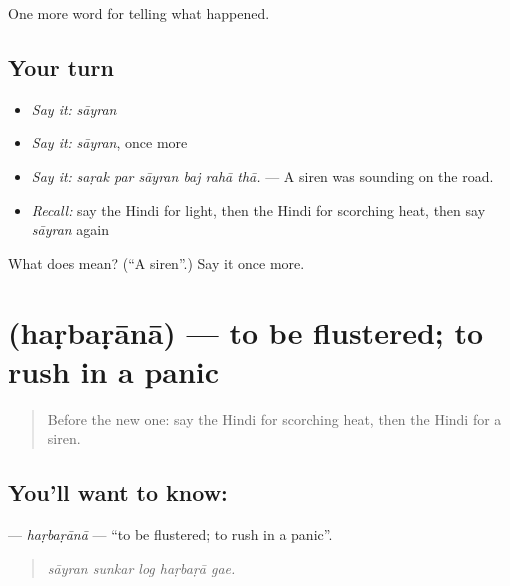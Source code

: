 \begin{grammarlens}[title={What you've built}]
One more word for telling what happened.
\end{grammarlens}

\subsection*{Your turn}
\begin{itemize}
\raggedright
  \item \emph{Say it:} \emph{sāyran}
  \item \emph{Say it:} \emph{sāyran}, once more
  \item \emph{Say it:} \emph{saṛak par sāyran baj rahā thā.} — A siren was sounding on the road.
  \item \emph{Recall:} say the Hindi for light, then the Hindi for scorching heat, then say \emph{sāyran} again
\end{itemize}

\begin{tcolorbox}[breakable,colback=teal!4,colframe=teal!35!black,title={Before you move on}]
What does  mean? (\textquotedblleft{}A siren\textquotedblright{}.) Say it once more.
\end{tcolorbox}
\section[\texorpdfstring{\hi{हड़बड़ाना} (haṛbaṛānā)}{हड़बड़ाना (haṛbaṛānā)}]{ (haṛbaṛānā) — to be flustered; to rush in a panic}

\label{lesson:HI-C301-harbarana}



\begin{quote}
Before the new one: say the Hindi for scorching heat, then the Hindi for a siren.
\end{quote}

\subsection*{You'll want to know: }
\textbf{} — \emph{haṛbaṛānā} — \textquotedblleft{}to be flustered; to rush in a panic\textquotedblright{}.

\begin{quote}
    
\end{quote}

\begin{quote}
\emph{sāyran sunkar log haṛbaṛā gae.}
\end{quote}

